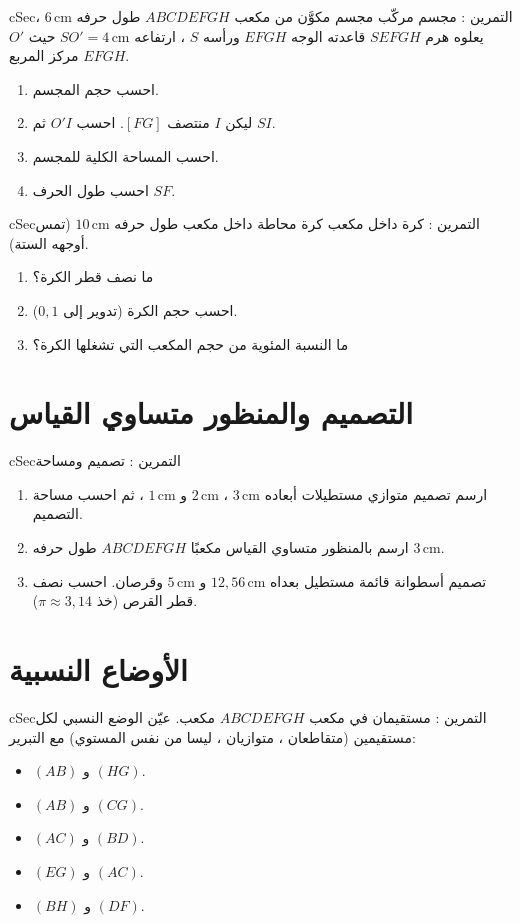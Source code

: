\documentclass[12pt,a4paper]{article}
\newenvironment{BOX}[2]{\begin{otherlanguage}{english}\begin{arbox}{#1}{#2}}{\end{arbox}\end{otherlanguage}}
\newcounter{exo}
\newenvironment{tamrin}[1]{\stepcounter{exo}\begin{BOX}{cSec}{التمرين \theexo: #1}}{\end{BOX}}
\newenvironment{sq}{\begin{itemize}[leftmargin=2.4em,itemsep=3pt]}{\end{itemize}}
\newcommand{\qa}{\item[(أ)]}\newcommand{\qb}{\item[(ب)]}\newcommand{\qc}{\item[(جـ)]}\newcommand{\qd}{\item[(د)]}\newcommand{\qe}{\item[(هـ)]}
\begin{document}
\begin{tamrin}{مجسم مركّب}
مجسم مكوَّن من مكعب $ABCDEFGH$ طول حرفه $6\,\mathrm{cm}$ ، يعلوه هرم $SEFGH$ قاعدته الوجه $EFGH$ ورأسه $S$ ، ارتفاعه $SO'=4\,\mathrm{cm}$ حيث $O'$ مركز المربع $EFGH$.
\begin{enumerate}
\item احسب حجم المجسم.
\item ليكن $I$ منتصف $[FG]$. احسب $O'I$ ثم $SI$.
\item احسب المساحة الكلية للمجسم.
\item احسب طول الحرف $SF$.
\end{enumerate}
\end{tamrin}

\begin{tamrin}{كرة داخل مكعب}
كرة محاطة داخل مكعب طول حرفه $10\,\mathrm{cm}$ (تمس أوجهه الستة).
\begin{enumerate}
\item ما نصف قطر الكرة؟
\item احسب حجم الكرة (تدوير إلى $0{,}1$).
\item ما النسبة المئوية من حجم المكعب التي تشغلها الكرة؟
\end{enumerate}
\end{tamrin}

\section{التصميم والمنظور متساوي القياس}
\begin{tamrin}{تصميم ومساحة}
\begin{enumerate}
\item ارسم تصميم متوازي مستطيلات أبعاده $3\,\mathrm{cm}$ ، $2\,\mathrm{cm}$ و $1\,\mathrm{cm}$ ، ثم احسب مساحة التصميم.
\item ارسم بالمنظور متساوي القياس مكعبًا $ABCDEFGH$ طول حرفه $3\,\mathrm{cm}$.
\item تصميم أسطوانة قائمة مستطيل بعداه $12{,}56\,\mathrm{cm}$ و $5\,\mathrm{cm}$ وقرصان. احسب نصف قطر القرص (خذ $\pi\approx3{,}14$).
\end{enumerate}
\end{tamrin}

\section{الأوضاع النسبية}
\begin{tamrin}{مستقيمان في مكعب}
$ABCDEFGH$ مكعب. عيّن الوضع النسبي لكل مستقيمين (متقاطعان ، متوازيان ، ليسا من نفس المستوي) مع التبرير:
\begin{sq}
\qa $(AB)$ و $(HG)$.
\qb $(AB)$ و $(CG)$.
\qc $(AC)$ و $(BD)$.
\qd $(EG)$ و $(AC)$.
\qe $(BH)$ و $(DF)$.
\end{sq}
\end{tamrin}
\end{document}
